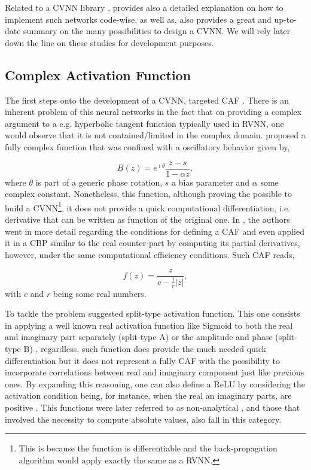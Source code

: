 Related to a \gls{CVNN} library \parencite{barrachina2023theory}, provides also a detailed explanation on how to implement such networks code-wise, as well as, \parencite{abdalla2023newtheory} also provides a great and up-to-date summary on the many possibilities to design a \gls{CVNN}. We will rely later down the line on these studies for development purposes.

\subsection{Complex Activation Function}
The first steps onto the development of  a \gls{CVNN}, targeted \gls{CAF} \parencite{clarke1990definition, georgiou1992fullfunc}. There is an inherent problem of this neural networks in the fact that on providing a complex argument to a e.g. hyperbolic tangent function typically used in \gls{RVNN}, one would observe that it is not contained/limited in the complex domain. \textcite{clarke1990definition} proposed a fully complex function  that was confined with a oscillatory behavior given by,

\begin{equation}
	B(z) = e^{\imath \theta} \dfrac{ z - s }{ 1 - \alpha z },
\end{equation}
where $ \theta $ is part of a generic phase rotation, $ s $ a bias parameter and $ \alpha $ some complex constant. Nonetheless, this function, although proving the possible to build a \gls{CVNN}\footnote{This is because the function is differentiable and the back-propagation algorithm would apply exactly the same \parencite{clarke1990definition} as a \gls{RVNN}.}, it does not provide a quick computational differentiation, i.e. derivative that can be written as function of the original one. In \parencite{georgiou1992fullfunc}, the authors went in more detail regarding the conditions for defining a \gls{CAF} and even applied it in a \gls{CBP} similar to the real counter-part by computing its partial derivatives, however, under the same computational efficiency conditions. Such \gls{CAF} reads,

\begin{equation}
	f(z) = \dfrac{ z }{ c - \frac{1}{r} \left| z \right| },
\end{equation}
with $c$ and $r$ being some real numbers.

To tackle the problem \textcite{benvenuto1992firstback} suggested split-type activation function. This one consists in applying a well known real activation function like Sigmoid to both the real and imaginary part separately (split-type A) or the amplitude and phase (split-type B) \parencite{abdalla2023newtheory}, regardless, such function does provide the much needed quick differentiation but it does not represent a fully \gls{CAF} with the possibility to incorporate correlations between real and imaginary component just like previous ones. By expanding this reasoning, one can also define a \gls{ReLU} by considering the activation condition being, for instance, when the real an imaginary parts, are positive \parencite{scardapane2020newactfuncs}. This functions were later referred to as non-analytical \parencite{scardapane2020newactfuncs}, and those that involved the necessity to compute absolute values, also fall in this category.

